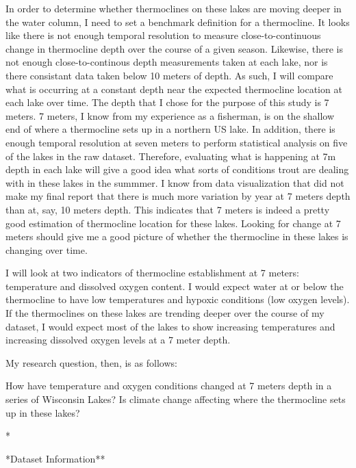 \documentclass[12pt,]{article}
\begin{document}
In order to determine whether thermoclines on these lakes are moving
deeper in the water column, I need to set a benchmark definition for a
thermocline. It looks like there is not enough temporal resolution to
measure close-to-continuous change in thermocline depth over the course
of a given season. Likewise, there is not enough close-to-continous
depth measurements taken at each lake, nor is there consistant data
taken below 10 meters of depth. As such, I will compare what is
occurring at a constant depth near the expected thermocline location at
each lake over time. The depth that I chose for the purpose of this
study is 7 meters. 7 meters, I know from my experience as a fisherman,
is on the shallow end of where a thermocline sets up in a northern US
lake. In addition, there is enough temporal resolution at seven meters
to perform statistical analysis on five of the lakes in the raw dataset.
Therefore, evaluating what is happening at 7m depth in each lake will
give a good idea what sorts of conditions trout are dealing with in
these lakes in the summmer. I know from data visualization that did not
make my final report that there is much more variation by year at 7
meters depth than at, say, 10 meters depth. This indicates that 7 meters
is indeed a pretty good estimation of thermocline location for these
lakes. Looking for change at 7 meters should give me a good picture of
whether the thermocline in these lakes is changing over time.

I will look at two indicators of thermocline establishment at 7 meters:
temperature and dissolved oxygen content. I would expect water at or
below the thermocline to have low temperatures and hypoxic conditions
(low oxygen levels). If the thermoclines on these lakes are trending
deeper over the course of my dataset, I would expect most of the lakes
to show increasing temperatures and increasing dissolved oxygen levels
at a 7 meter depth.

My research question, then, is as follows:

How have temperature and oxygen conditions changed at 7 meters depth in
a series of Wisconsin Lakes? Is climate change affecting where the
thermocline sets up in these lakes?

\newpage
*

*Dataset Information**
\end{document}
